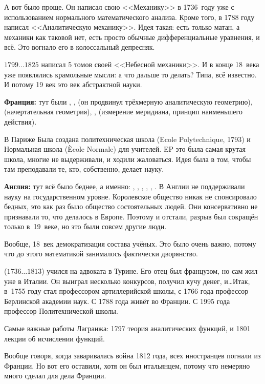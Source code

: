 \documentclass[a4paper,oneside,fleqn,10pt]{article}
\newcommand{\pe}[2]{${#1}\ldots{#2}$}
\begin{document}
А вот  было проще. Он написал свою <<Механику>> в
1736~году уже с использованием нормального математического
анализа. Кроме того, в 1788 году  написал
<<Аналитическую механику>>. Идея такая: есть только матан, а механики
как таковой нет, есть просто обычные дифференциальные уравнения, и
всё. Это вогнало его в колоссальный депресняк.

\pe{1799}{1825}  написал 5 томов своей <<Небесной
механики>>. И в конце 18~века уже появлялись крамольные мысли: а что
дальше то делать? Типа, всё известно.  И потому 19 век это век
абстрактной науки.

\textbf{Франция:} тут были , , 
(он продвинул трёхмерную аналитическую геометрию), 
(начертательная геометрия), , 
(измерение меридиана, принцип наименьшего действия).

В Париже Была создана политехническая школа (Ecole Polytechnique,
1793) и Нормальная школа (\`Ecole Normale) для учителей.  EP это была
самая крутая школа, многие не выдерживали, и ходили жаловаться.  Идея
была в том, чтобы там преподавали те, кто, собственно, делает науку.

\textbf{Англия:} тут всё было беднее, а именно: ,
, , , ,
.  В Англии не поддерживали науку на государственном
уровне. Королевское общество никак не спонсировало бедных, это как раз
было общество состоятельных людей.  Они консервативно не признавали
то, что делалось в Европе. Поэтому и отстали, разрыв был сокращён
только в~19~веке, но это были совсем другие люди.

Вообще, 18~век демократизация состава учёных.  Это было очень важно,
потому что до этого математикой занималось фактически дворянство.

 (\pe{1736}{1813}) учился на адвоката в Турине. Его отец
был французом, но сам жил уже в Италии. Он выиграл несколько
конкурсов, получил кучу денег, и\ldots Итак, в~1755 году стал
профессором артиллерийской школы, с 1766 года профессор Берлинской
академии наук. С 1788 года живёт во Франции. С 1995 года профессор
Политехнической школы.

Самые важные работы Лагранжа: 1797 теория аналитических функций, и
1801 лекции об исчислении функций.

Вообще говоря, когда заваривалась война 1812 года, всех иностранцев
погнали из Франции.  Но вот его оставили, хотя он был итальянцем,
потому что немеряно много сделал для дела Франции.
\end{document}
